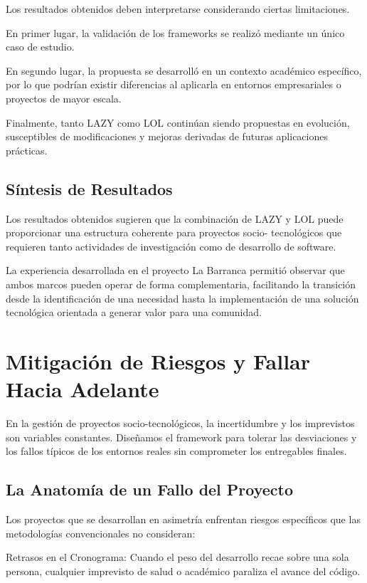 \documentclass[14pt,a4paper,oneside]{extbook}
\begin{document}
Los resultados obtenidos deben interpretarse considerando ciertas limitaciones.

En primer lugar, la validación de los frameworks se realizó mediante un único caso de estudio.

En segundo lugar, la propuesta se desarrolló en un contexto académico específico, por lo que podrían existir diferencias al aplicarla en entornos empresariales o proyectos de mayor escala.

Finalmente, tanto LAZY como LOL continúan siendo propuestas en evolución, susceptibles de modificaciones y mejoras derivadas de futuras aplicaciones prácticas.

\section{Síntesis de Resultados}

Los resultados obtenidos sugieren que la combinación de LAZY y LOL puede proporcionar una estructura coherente para proyectos socio-
tecnológicos que requieren tanto actividades de investigación como de desarrollo de software.

La experiencia desarrollada en el proyecto La Barranca permitió observar que ambos marcos pueden operar de forma complementaria, facilitando la transición desde la identificación de una necesidad hasta la implementación de una solución tecnológica orientada a generar valor para una comunidad.


\chapter{Mitigación de Riesgos y Fallar Hacia Adelante}

En la gestión de proyectos socio-tecnológicos, la incertidumbre y los imprevistos son variables constantes. Diseñamos el framework para tolerar las desviaciones y los fallos típicos de los entornos reales sin comprometer los entregables finales.

\section{La Anatomía de un Fallo del Proyecto}

Los proyectos que se desarrollan en asimetría enfrentan riesgos específicos que las metodologías convencionales no consideran:

Retrasos en el Cronograma: Cuando el peso del desarrollo recae sobre una sola persona, cualquier imprevisto de salud o académico paraliza el avance del código.
\end{document}
